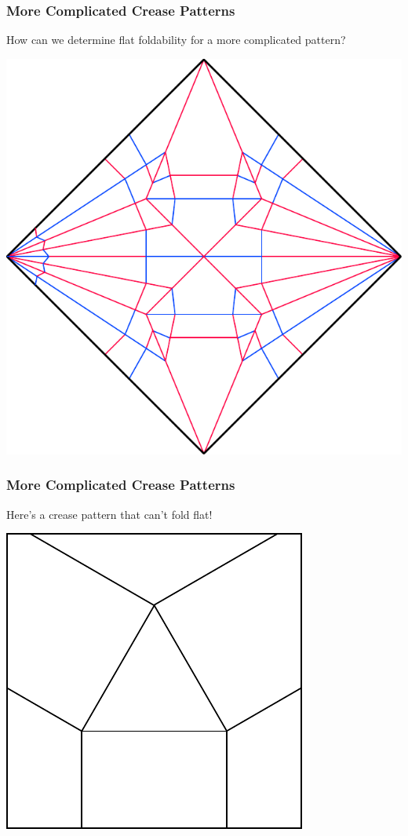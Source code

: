 \documentclass{beamer}
\begin{document}
\begin{frame}
\frametitle{More Complicated Crease Patterns}
\begin{block}{}
How can we determine flat foldability for a more complicated pattern?
\newline
\end{block}
\begin{center}
\includegraphics[width=.45\textwidth]{foldability_pix/crane-assigned.pdf}
\end{center}
\end{frame}

\begin{frame}
\frametitle{More Complicated Crease Patterns}
\begin{block}{}
Here's a crease pattern that can't fold flat!
\end{block}
\begin{center}
\includegraphics[width=.5\textwidth]{foldability_pix/unfoldable.pdf}
\end{center}
\end{frame}

\end{document}
